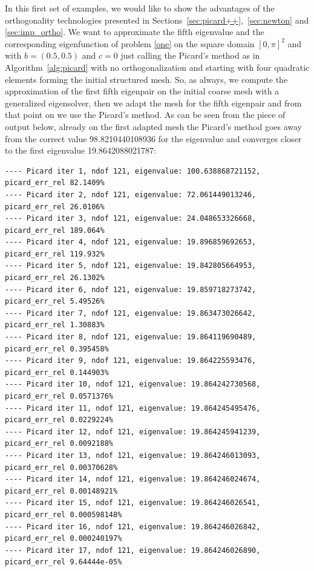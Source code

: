 \documentclass[smallextended]{svjour3}
\begin{document}
In this first set of examples, we would like to show the advantages of the orthogonality technologies presented in Sections~\ref{sec:picard++},~\ref{sec:newton} and \ref{sec:imp_ortho}.
We want to approximate the fifth eigenvalue and the corresponding eigenfunction of problem \eqref{one} on the square domain $[0,\pi]^2$ and with $b=(0.5,0.5)$ and $c=0$ just calling the Picard's method as in Algorithm~\ref{alg:picard} with no orthogonalization and starting with four quadratic elements forming the initial structured mesh.
So, as always, we compute the approximation of the first fifth eigenpair on the initial coarse mesh with a generalized eigensolver, then we adapt the mesh for the fifth eigenpair and from that point on we use the Picard's method.
As can be seen from the piece of output below, already on the first adapted mesh the Picard's method goes away from the correct value 98.8210440108936 for the eigenvalue and converges closer to the first eigenvalue 19.8642088021787: \\

{\small
\begin{verbatim}
---- Picard iter 1, ndof 121, eigenvalue: 100.638868721152, picard_err_rel 82.1409%
---- Picard iter 2, ndof 121, eigenvalue: 72.061449013246, picard_err_rel 26.0106%
---- Picard iter 3, ndof 121, eigenvalue: 24.048653326668, picard_err_rel 189.064%
---- Picard iter 4, ndof 121, eigenvalue: 19.896859692653, picard_err_rel 119.932%
---- Picard iter 5, ndof 121, eigenvalue: 19.842805664953, picard_err_rel 26.1302%
---- Picard iter 6, ndof 121, eigenvalue: 19.859718273742, picard_err_rel 5.49526%
---- Picard iter 7, ndof 121, eigenvalue: 19.863473026642, picard_err_rel 1.30883%
---- Picard iter 8, ndof 121, eigenvalue: 19.864119690489, picard_err_rel 0.395458%
---- Picard iter 9, ndof 121, eigenvalue: 19.864225593476, picard_err_rel 0.144903%
---- Picard iter 10, ndof 121, eigenvalue: 19.864242730568, picard_err_rel 0.0571376%
---- Picard iter 11, ndof 121, eigenvalue: 19.864245495476, picard_err_rel 0.0229224%
---- Picard iter 12, ndof 121, eigenvalue: 19.864245941239, picard_err_rel 0.0092188%
---- Picard iter 13, ndof 121, eigenvalue: 19.864246013093, picard_err_rel 0.00370628%
---- Picard iter 14, ndof 121, eigenvalue: 19.864246024674, picard_err_rel 0.00148921%
---- Picard iter 15, ndof 121, eigenvalue: 19.864246026541, picard_err_rel 0.000598148%
---- Picard iter 16, ndof 121, eigenvalue: 19.864246026842, picard_err_rel 0.000240197%
---- Picard iter 17, ndof 121, eigenvalue: 19.864246026890, picard_err_rel 9.64444e-05%
\end{verbatim}
}
\end{document}
